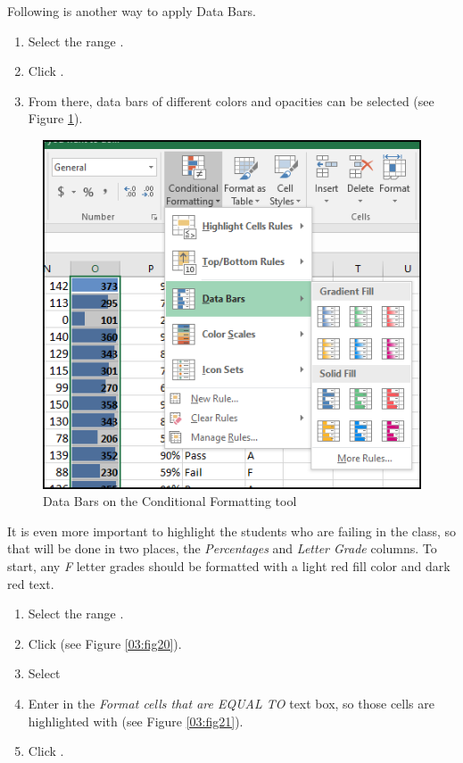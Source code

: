 Following is another way to apply Data Bars.

\begin{enumbox}
	\begin{enumerate}
		\item Select the range .
		\item Click . 	
		\item From there, data bars of different colors and opacities can be selected (see Figure \ref{03:fig19}).
	\end{enumerate}
\end{enumbox}
	
\begin{figure}[H]
	\centering
	\includegraphics[width=\maxwidth{.95\linewidth}]{gfx/ch03_fig19}
	\caption{Data Bars on the Conditional Formatting tool}
	\label{03:fig19}
\end{figure}

It is even more important to highlight the students who are failing in the class, so that will be done in two places, the \textit{Percentages} and \textit{Letter Grade} columns. To start, any \textit{F} letter grades should be formatted with a light red fill color and dark red text.

\begin{enumbox}
	\begin{enumerate}
		\item Select the range .
		\item Click  (see Figure \ref{03:fig20}).
		\item Select 
		\item Enter  in the \textit{Format cells that are EQUAL TO} text box, so those cells are highlighted with  (see Figure \ref{03:fig21}).
		\item Click .
	\end{enumerate}
\end{enumbox}
	
